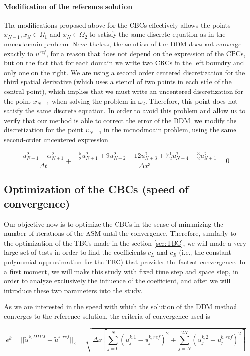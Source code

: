\paragraph{Modification of the reference solution}

\indent The modifications proposed above for the CBCs effectively allows the points $x_{N-1},x_N \in \Omega_1$ and $x_N \in \Omega_2$ to satisfy the same discrete equation as in the monodomain problem. Nevertheless, the solution of the DDM does not converge exactly to $u^{ref}$, for a reason that does not depend on the expression of the CBCs, but on the fact that for each domain we write two CBCs in the left boundry and only one on the right. We are using a second order centered discretization for the third spatial derivative (which uses a stencil of two points in each side of the central point), which implies that we must write an uncentered discretization for the point $x_{N+1}$ when solving the problem in $\omega_2$. Therefore, this point does not satisfy the same discrete equation. In order to avoid this problem and allow us to verify that our method is able to correct the error of the DDM, we modify the discretization for the point $u_{N+1}$ in the monodmoain problem, using the same second-order uncentered expression 

\begin{equation}
    \label{eq:uncenteredFDdiscretizationN}
    \frac{u_{N+1}^2 - \alpha_{N+1}^2}{\Delta t} + \frac{-\frac{5}{2}u_{N+1}^2 + 9u_{N+2}^2 - 12 u_{N+3}^2 + 7\frac{1}{2}u_{N+4}^2 -\frac{3}{2}u_{N+1}^2}{\Delta x ^3} = 0
\end{equation}

\subsection{Optimization of the CBCs (speed of convergence)}

\indent Our objective now is to optimize the CBCs in the sense of minimizing the number of iterations of the ASM until the convergence. Therefore, similarly to the optimization of the TBCs made in the section \ref{sec:TBC}, we will made a very large set of tests in order to find the coefficients $c_L$ and $c_R$ (i.e., the constant polynomial approximation for the TBC) that provides the fastest convergence. In a first moment, we will make this study with fixed time step and space step, in order to analyze exclusively the influence of the coefficient, and after we will introduce these two parameters into the study.

\indent As we are interested in the speed with which the solution of the DDM method converges to the reference solution, the criteria of convergence used is

\begin{equation}
\label{eq:criteriaConvergence}
	e^k = ||\tilde{u}^{k,DDM} - \tilde{u}^{k,ref}||_2 = \sqrt{\Delta x \left[ \sum_{j=0}^{N}{\left(u^{k,1}_j - u^{k,ref}_j \right)^2} + \sum_{j=N}^{2N}{\left(u^{k,2}_j - u^{k,ref}_j \right)^2} \right]} 
\end{equation}
